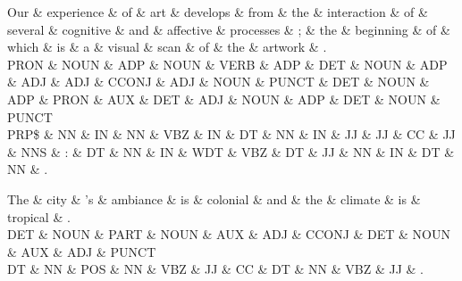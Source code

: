 
\begin{dependency}
\begin{deptext}
Our \& experience \& of \& art \& develops \& from \& the \& interaction \& of \& several \& cognitive \& and \& affective \& processes \& ; \& the \& beginning \& of \& which \& is \& a \& visual \& scan \& of \& the \& artwork \& . \\
PRON \& NOUN \& ADP \& NOUN \& VERB \& ADP \& DET \& NOUN \& ADP \& ADJ \& ADJ \& CCONJ \& ADJ \& NOUN \& PUNCT \& DET \& NOUN \& ADP \& PRON \& AUX \& DET \& ADJ \& NOUN \& ADP \& DET \& NOUN \& PUNCT \\
PRP\$ \& NN \& IN \& NN \& VBZ \& IN \& DT \& NN \& IN \& JJ \& JJ \& CC \& JJ \& NNS \& : \& DT \& NN \& IN \& WDT \& VBZ \& DT \& JJ \& NN \& IN \& DT \& NN \& . \\
\end{deptext}



\end{dependency}

\begin{dependency}
\begin{deptext}
The \& city \& 's \& ambiance \& is \& colonial \& and \& the \& climate \& is \& tropical \& . \\
DET \& NOUN \& PART \& NOUN \& AUX \& ADJ \& CCONJ \& DET \& NOUN \& AUX \& ADJ \& PUNCT \\
DT \& NN \& POS \& NN \& VBZ \& JJ \& CC \& DT \& NN \& VBZ \& JJ \& . \\
\end{deptext}



\end{dependency}

